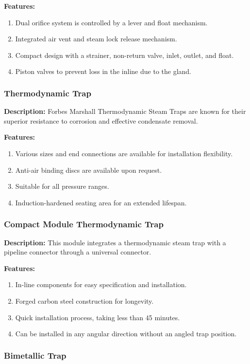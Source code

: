 \textbf{Features:}
\begin{enumerate}
    \item Dual orifice system is controlled by a lever and float mechanism.
    \item Integrated air vent and steam lock release mechanism.
    \item Compact design with a strainer, non-return valve, inlet, outlet, and float.
    \item Piston valves to prevent loss in the inline due to the gland.
\end{enumerate}
\subsubsection{Thermodynamic Trap}

\textbf{Description:} Forbes Marshall Thermodynamic Steam Traps are known for their superior resistance to corrosion and effective condensate removal.

\textbf{Features:}
\begin{enumerate}
    \item Various sizes and end connections are available for installation flexibility.
    \item Anti-air binding discs are available upon request.
    \item Suitable for all pressure ranges.
    \item Induction-hardened seating area for an extended lifespan.
\end{enumerate}
\subsubsection{Compact Module Thermodynamic Trap}

\textbf{Description:} This module integrates a thermodynamic steam trap with a pipeline connector through a universal connector.

\textbf{Features:}
\begin{enumerate}
    \item In-line components for easy specification and installation.
    \item Forged carbon steel construction for longevity.
    \item Quick installation process, taking less than 45 minutes.
    \item Can be installed in any angular direction without an angled trap position.
\end{enumerate}
\subsubsection{Bimetallic Trap}

